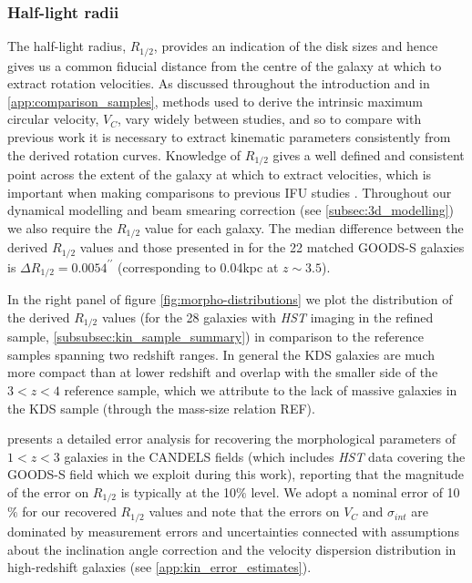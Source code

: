 \documentclass[fleqn,usenatbib]{mn2e}
\begin{document}
\subsubsection{Half-light radii}\label{subsubsection:half-light_radii}
The half-light radius, $R_{1/2}$, provides an indication of the disk sizes and hence gives us a common fiducial distance from the centre of the galaxy at which to extract rotation velocities.
As discussed throughout the introduction and in \cref{app:comparison_samples}, methods used to derive the intrinsic maximum circular velocity, $V_{C}$, vary widely between studies, and so to compare with previous work it is necessary to extract kinematic parameters consistently from the derived rotation curves.
Knowledge of $R_{1/2}$ gives a well defined and consistent point across the extent of the galaxy at which to extract velocities, which is important when making comparisons to previous IFU studies \citep[see \protect\cref{app:comparison_samples} and e.g.][]{ForsterSchreiber2009,Epinat2012,Wisnioski2015,Stott2016,Harrison2017,Swinbank2017}.
Throughout our dynamical modelling and beam smearing correction (see \cref{subsec:3d_modelling}) we also require the $R_{1/2}$ value for each galaxy.
The median difference between the derived $R_{1/2}$ values and those presented in \cite{VanderWel2012} for the 22 matched GOODS-S galaxies is $\Delta R_{1/2} = 0.0054^{\prime\prime}$ (corresponding to 0.04kpc at $z\sim3.5$).

In the right panel of figure \ref{fig:morpho-distributions} we plot the distribution of the derived $R_{1/2}$ values (for the 28 galaxies with {\em HST} imaging in the refined sample, \cref{subsubsec:kin_sample_summary}) in comparison to the reference samples spanning two redshift ranges.
In general the KDS galaxies are much more compact than at lower redshift and overlap with the smaller side of the $3 < z < 4$ reference sample, which we attribute to the lack of massive galaxies in the KDS sample (through the mass-size relation REF).

\cite{Bruce2012} presents a detailed error analysis for recovering the morphological parameters of $1 < z < 3$ galaxies in the CANDELS fields (which includes {\em HST} data covering the GOODS-S field which we exploit during this work), reporting that the magnitude of the error on $R_{1/2}$ is typically at the 10$\%$ level.
We adopt a nominal error of 10$\%$ for our recovered $R_{1/2}$ values and note that the errors on $V_{C}$ and $\sigma_{int}$ are dominated by measurement errors and uncertainties connected with assumptions about the inclination angle correction and the velocity dispersion distribution in high-redshift galaxies (see \cref{app:kin_error_estimates}).
\end{document}
